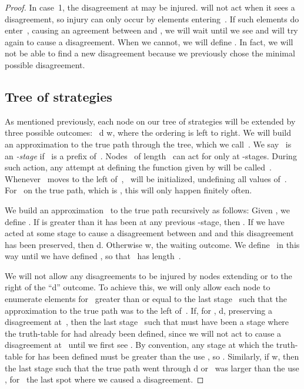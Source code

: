 \documentclass{LMCS}
\newcommand{\0}{\mathbf{0}}
\newcommand{\<}{\langle}
\renewcommand{\>}{\rangle}
\begin{document}
\begin{proof}
\noindent In case~1, the disagreement at  may be injured.  will not
act when it sees a disagreement, so injury can only occur by elements
entering~. If such elements do enter~, causing an agreement between
 and , we will wait until we see
 and will try again to cause a disagreement. When we cannot,
we will define . In fact, we will not be able to
find a new disagreement because we previously chose the minimal possible
disagreement.



\subsection{Tree of strategies}\label{treeofstrategies}

As mentioned previously, each node on our tree of strategies will be extended
by three possible outcomes:~ d  w, where the ordering is left to
right.  We will build an approximation to the true path through the tree,
which we call~.  We say~ is an {\em -stage} if~
is a prefix of~.  Nodes~ of length~ can act for
 only at -stages.  During such action, any attempt at
defining the function given by  will be
called~.  Whenever~ moves to the left
of~,~ will be initialized, undefining all values
of~.  For~ on the true path, which is  , this will only happen finitely often.

We build an approximation~ to the true path recursively as follows:
Given , we define .
If  is greater than it has been at any previous -stage,
then .
If we have acted at some stage  to cause a disagreement between
 and  and this disagreement has been
preserved, then  d. Otherwise  w, the waiting
outcome. We define~ in this way until we have defined
, so that~ has length~.

We will not allow any disagreements to be injured by nodes extending or to
the right of the ``d'' outcome.  To achieve this, we will only allow each
node  to enumerate elements  for~
greater than or equal to the last stage~ such that the
approximation to the true path was to the left of~.  If, for ,
 d, preserving a disagreement at~, then the last stage~
such that  must have been a stage where the truth-table
for  had already been defined, since we will not act to cause a
disagreement at~ until we first see .  By convention, any
stage at which the truth-table for  has been defined must be
greater than the use , so . Similarly,
if  w, then the last stage such that the true path went
through d or~ was larger than the use , for~ the
last spot where we caused a disagreement.




\end{proof}
\end{document}

